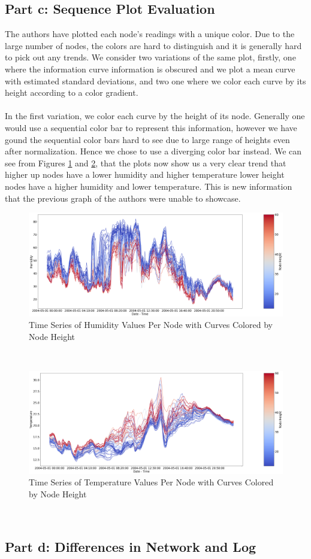 \documentclass[11pt, letterpaper]{article}
\begin{document}
\subsection{Part c: Sequence Plot Evaluation}
The authors have plotted each node's readings with a unique color. Due to the large number of nodes, the colors are hard to distinguish and it is generally hard to pick out any trends. We consider two variations of the same plot, firstly, one where the information curve information is obscured and we plot a mean curve with estimated standard deviations, and two one where we color each curve by its height according to a color gradient.
\\
\\
In the first variation, we color each curve by the height of its node. Generally one would use a sequential color bar to represent this information, however we have gound the sequential color bars hard to see due to large range of heights even after normalization. Hence we chose to use a diverging color bar instead. We can see from Figures \ref{fig:graph_crtique_c1} and \ref{fig:graph_crtique_c2}, that the plots now show us a very clear trend that higher up nodes have a lower humidity and higher temperature lower height nodes have a higher humidity and lower temperature.  This is new information that the previous graph of the authors were unable to showcase.
\begin{figure}[h!]
\centering
\includegraphics[width=1.0\textwidth]{Report Images/fig8_graph_critique_c1.png}
\caption{Time Series of Humidity Values Per Node with Curves Colored by Node Height}
\label{fig:graph_crtique_c1}
\end{figure}
\\
\begin{figure}[h!]
\centering
\includegraphics[width=1.0\textwidth]{Report Images/fig8_graph_critique_c2.png}
\caption{Time Series of Temperature Values Per Node with Curves Colored by Node Height}
\label{fig:graph_crtique_c2}
\end{figure}
\\

\subsection{Part d: Differences in Network and Log}
\end{document}
